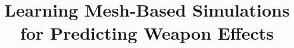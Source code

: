 \documentclass{NSF}
\begin{document}

\title{Learning Mesh-Based Simulations for Predicting Weapon Effects}




\newpage{}


\newpage{}


\newpage{}


\newpage{}


\newpage{}


\newpage{}


\newpage{}
\renewcommand\refname{References Cited}



\newpage{}

\end{document}
